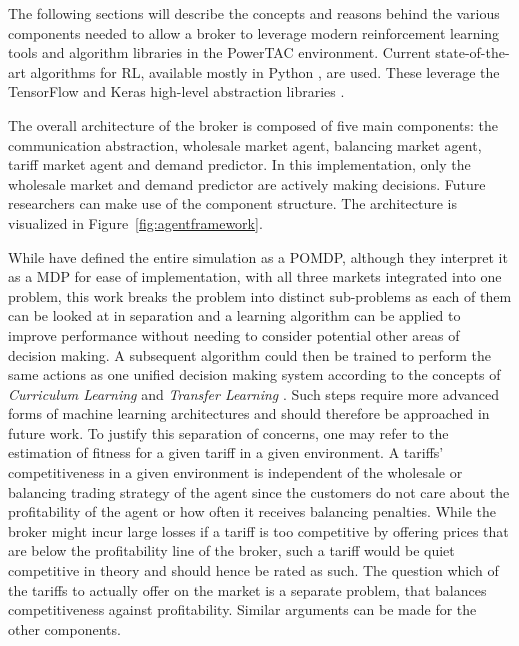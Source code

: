 The following sections will describe the concepts and reasons behind the various components needed to allow a broker to
leverage modern reinforcement learning tools and algorithm libraries in the \ac{PowerTAC} environment. Current
state-of-the-art algorithms for \ac{RL}, available mostly in Python \citep{baselines}, are used. These leverage the
TensorFlow and Keras high-level abstraction libraries \citep{plappert2016kerasrl}.


The overall architecture of the broker is composed of five main components: the communication abstraction, wholesale market
agent, balancing market agent, tariff market agent and demand predictor. In this implementation, only the wholesale
market and demand predictor are actively making decisions. Future researchers can make use of the component structure.
The architecture is visualized in Figure~\ref{fig:agentframework}.

While \citep{tactexurieli2016mdp} have defined the entire simulation as a \ac{POMDP}, although they interpret it as a
\ac{MDP} for ease of implementation, with all three markets integrated into one problem, this work breaks the problem
into distinct sub-problems as each of them can be looked at in separation and a learning algorithm
can be applied to improve performance without needing to consider potential other areas of decision making. A
subsequent algorithm could then be trained to perform the same actions as one unified decision making system according
to the concepts of \emph{Curriculum Learning}\citep{matiisen2017teacher} and \emph{Transfer Learning}
\citep{parisotto2015actor}. Such steps require more advanced forms of machine learning architectures and should
therefore be approached in future work.
To justify this separation of concerns, one may refer to the estimation of fitness for a given tariff in a given environment.
A tariffs' competitiveness in a given environment is independent of the wholesale or balancing trading strategy of the
agent since the customers do not care about the profitability of the agent or how often it receives balancing penalties.
While the broker might incur large losses if a tariff is too competitive by offering prices that are below the
profitability line of the broker, such a tariff would be quiet competitive in theory and should hence be rated
as such. The question which of the tariffs to actually offer on the market is a separate problem, that balances
competitiveness against profitability. Similar arguments can be made for the other components.

